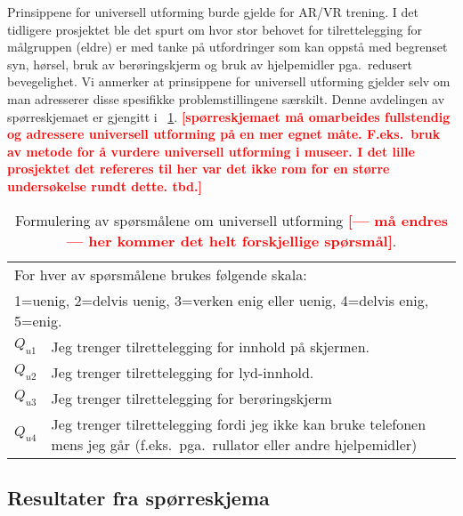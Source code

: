 \documentclass[11pt,english]{nik}
\newcommand{\WVL}[1]{\textbf{\textcolor{red}{#1}}}
\begin{document}

Prinsippene for universell utforming burde gjelde for AR/VR trening.
I det tidligere prosjektet ble det spurt om  hvor stor behovet for tilrettelegging for
målgruppen (eldre) er med tanke på utfordringer som kan oppstå med
begrenset syn, hørsel, bruk av berøringskjerm og bruk av hjelpemidler
pga.\ redusert bevegelighet. Vi anmerker at prinsippene for universell
utforming gjelder selv om man adresserer disse spesifikke
problemstillingene særskilt. 
Denne avdelingen
av spørreskjemaet er gjengitt i \tablename~\ref{tab:questions:uu}.
\WVL{[spørreskjemaet må omarbeides fullstendig og adressere universell utforming på en mer egnet måte. 
F.eks.\ bruk av metode for å vurdere universell utforming i museer. I
det lille prosjektet det refereres til her var det ikke rom for en
større undersøkelse rundt dette. tbd.]}


\begin{table}
    \caption{Formulering av spørsmålene om universell utforming \WVL{[--- må endres --- her kommer det helt forskjellige spørsmål]}.} \label{tab:questions:uu}
\centering\small
\begin{tabular}{lp{.9\hsize}}
\multicolumn{2}{p{.99\hsize}}{For hver av spørsmålene brukes følgende skala:}\\ 
\multicolumn{2}{p{.99\hsize}}{1=uenig, 2=delvis uenig, 3=verken enig eller uenig, 4=delvis enig, 5=enig.}\\
\hline
\(Q_{u1}\) & Jeg trenger tilrettelegging for innhold på skjermen.\\
\(Q_{u2}\) & Jeg trenger tilrettelegging for lyd-innhold.\\
\(Q_{u3}\) & Jeg trenger tilrettelegging for berøringskjerm\\
\(Q_{u4}\) & Jeg trenger tilrettelegging fordi jeg ikke kan bruke telefonen mens jeg går (f.eks.\ pga.\
rullator eller andre hjelpemidler)
\end{tabular}
\end{table}



\subsection{Resultater fra spørreskjema}
\end{document}
